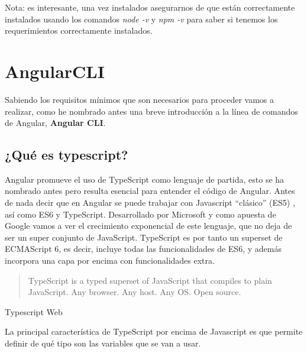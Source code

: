 Nota: es interesante, una vez instalados asegurarnos de que están correctamente instalados usando los comandos \emph{node -v} y \emph{npm -v} para saber si tenemos los requerimientos correctamente instalados.


\section{AngularCLI}\label{angularCLI}
Sabiendo los requisitos mínimos que son necesarios para proceder vamos a realizar, como he nombrado antes una breve introducción a la línea de comandos de Angular,  \textbf{Angular CLI}.

\subsection{¿Qué es typescript?}\label{typesript}
Angular  promueve el uso de TypeScript como lenguaje de partida, esto se ha nombrado antes pero resulta esencial para entender el código de Angular. Antes de nada decir que en Angular se puede trabajar con Javascript “clásico” (ES5) \cite{ecma}, así como ES6 y TypeScript. Desarrollado por Microsoft y como apuesta de Google vamos a ver el crecimiento exponencial de este lenguaje, que no deja de ser un super conjunto de JavaScript. 
 TypeScript es por tanto un superset de ECMAScript 6, es decir, incluye todas las funcionalidades de ES6, y además incorpora una capa por encima con funcionalidades extra.

\begin{center}
    \begin{minipage}{0.9\linewidth}
        \vspace{5pt}%
        {\small
        \begin{quote}
            TypeScript is a typed superset of JavaScript that compiles to plain JavaScript. Any browser. Any host. Any OS. Open source.
            \end{quote}
        }
        \begin{flushright}
            Typescript Web \cite{typescript}
        \end{flushright}
        \vspace{5pt}%
    \end{minipage}
\end{center}

La principal característica de TypeScript por encima de Javascript es que permite definir de qué tipo son las variables que se van a usar.


